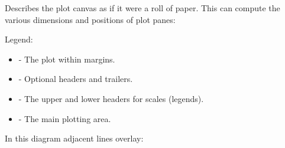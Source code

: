 \documentclass[letterpaper,10pt,english]{sphinxmanual}
\begin{document}
\begin{fulllineitems}
\label{\detokenize{ref/util/plot/Plot:TotalDepth.util.plot.Plot.PlotRoll}}
Describes the plot canvas as if it were a roll of paper.
This can compute the various dimensions and positions of plot panes:

Legend:
\begin{itemize}
\item {} 
 - The plot within margins.

\item {} 
\sphinxcode{***} - Optional headers and trailers.

\item {} 
\sphinxcode{+++} - The upper and lower headers for scales (legends).

\item {} 
\sphinxcode{\textasciicircum{}\textasciicircum{}\textasciicircum{}} - The main plotting area.

\end{itemize}

In this diagram adjacent lines overlay:


\end{fulllineitems}
\end{document}
